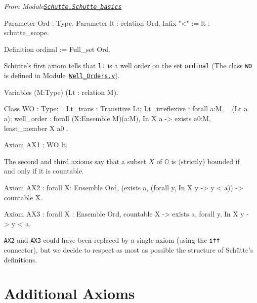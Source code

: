 \vspace{6pt}

\emph{From Module\href{../theories/html/hydras.Schutte.Schutte_basics.html}%
{\texttt{Schutte.Schutte\_basics}}}

\begin{Coqsrc}
Parameter Ord : Type.
Parameter lt : relation Ord.
Infix "<" := lt : schutte_scope.

Definition ordinal := Full_set Ord.
\end{Coqsrc}

Schütte's first axiom tells that \texttt{lt} is a well order on the set 
\texttt{ordinal} (The  class \texttt{WO} is defined in
Module~\href{../theories/html/hydras.Schutte.Well_Orders.html}%
{\texttt{Well\_Orders.v}}).

\label{types:WO}

\begin{Coqsrc}
Variables (M:Type)
         (Lt : relation M).
  
Class WO : Type:=
    {
      Lt_trans : Transitive  Lt;
      Lt_irreflexive : forall a:M, ~ (Lt a a);
      well_order : forall (X:Ensemble M)(a:M),
          In X a ->
          exists a0:M, least_member  X a0
    }.
\end{Coqsrc}



\begin{Coqsrc}
  Axiom AX1 : WO lt.
\end{Coqsrc}

The second and third axioms say that a subset $X$ of $\mathbb{O}$ is
(strictly) bounded if and only if it is countable. 



\begin{Coqsrc}
Axiom AX2 : forall X: Ensemble Ord, 
   (exists a,  (forall y, In X y -> y < a)) ->
   countable X.

Axiom AX3 : forall X : Ensemble Ord,
              countable X -> 
              exists a,  forall y, In X y -> y < a.
\end{Coqsrc}

\texttt{AX2} and \texttt{AX3} could have been replaced by a single axiom (using the \texttt{iff} connector), but we decide to respect as most as possible the structure of Schütte's definitions.

\section{Additional  Axioms}

